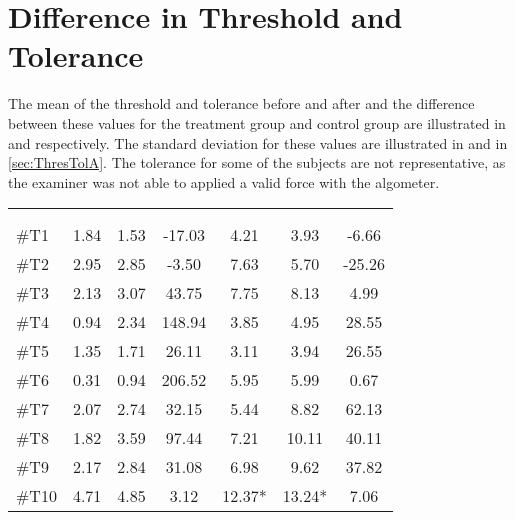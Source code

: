 \section{Difference in Threshold and Tolerance}
The mean of the threshold and tolerance before and after and the difference between these values for the treatment group and control group are illustrated in   and  respectively. The standard deviation for these values are illustrated in  and  in \autoref{sec:ThresTolA}. The tolerance for some of the subjects are not representative, as the examiner was not able to applied a valid force with the algometer. 

\begin{longtable} {l|c|c|c|c|c|c}
 \rowcolor[HTML]{C0C0C0} 
  \color[HTML]{000000}{} & 
 \multicolumn{3}{c|}{ \color[HTML]{000000}{\textbf{Threshold}}} & \multicolumn{3}{c}{ \color[HTML]{000000}{\textbf{Tolerance}}}  	\\  \rule{0pt}{3ex} 
  \cellcolor[HTML]{C0C0C0}{} &
 \multicolumn{1}{c|}{ \cellcolor[HTML]{C0C0C0}{Pre [KgF]}} & \multicolumn{1}{c|}{ \cellcolor[HTML]{C0C0C0}{Post [KgF]}} 
 & \multicolumn{1}{c}{ \cellcolor[HTML]{C0C0C0}{\textcolor[HTML]{C0C0C0}{0}Diff [\%]\textcolor[HTML]{C0C0C0}{0}}}
 & \multicolumn{1}{|c|}{ \cellcolor[HTML]{C0C0C0}{Pre [KgF]}} 
 & \multicolumn{1}{c|}{ \cellcolor[HTML]{C0C0C0}{Post [KgF]}} 
 & \multicolumn{1}{c}{ \cellcolor[HTML]{C0C0C0}{\textcolor[HTML]{C0C0C0}{0}Diff [\%]\textcolor[HTML]{C0C0C0}{0}}}  	\\ \hline 
\#T1 & 1.84 & 1.53 & -17.03 & 4.21 & 3.93 & -6.66 \\ \hline
\#T2 & 2.95 & 2.85  & -3.50 & 7.63  & 5.70 & -25.26 \\ \hline
\#T3 & 2.13 & 3.07 & 43.75 & 7.75 & 8.13 & 4.99 \\ \hline
\#T4 & 0.94 & 2.34  & 148.94  & 3.85 & 4.95 & 28.55 \\ \hline
\#T5 & 1.35 & 1.71  & 26.11 & 3.11 & 3.94 & 26.55 \\ \hline	
\#T6 & 0.31 & 0.94   & 206.52 & 5.95 & 5.99 & 0.67 \\ \hline
\#T7 & 2.07 & 2.74  & 32.15 & 5.44 & 8.82 & 62.13 \\ \hline
\#T8 & 1.82 & 3.59 & 97.44 & 7.21 & 10.11 & 40.11 \\ \hline
\#T9 & 2.17 & 2.84  & 31.08 & 6.98 & 9.62 & 37.82 \\ \hline
\#T10 & 4.71 & 4.85  & 3.12 & 12.37*  & 13.24* & 7.06 \\ \hline

\end{longtable}
